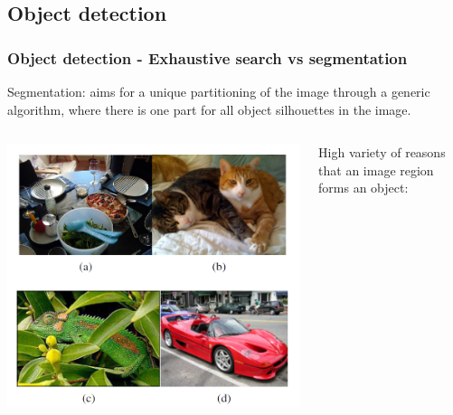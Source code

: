 \subsection{Object detection}

\begin{frame}[allowframebreaks]
	\frametitle{Object detection - Exhaustive search vs segmentation}

	Segmentation: aims for
	a unique partitioning of the image through a generic algorithm,
	where there is one part for all object silhouettes in the image.

	\medskip

\begin{columns} %

		\begin{column}{.5\textwidth}
			\begin{center}
				\includegraphics[scale=0.6]{figs/selectivesearch_pictures}
			\end{center}
		\end{column}%



		\begin{column}{.4\textwidth}
		High variety of reasons that an image region forms an object:



		\end{column}%
	\end{columns}


\end{frame}
